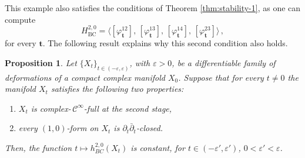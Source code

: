 \documentclass[a4paper]{amsart}
\newtheorem{proposition}[theorem]{Proposition}
\theoremstyle{definition}
\theoremstyle{remark}
\numberwithin{equation}{section}
\begin{document}
This example also satisfies the conditions of Theorem \ref{thm:stability-1}, as one can compute
\[
H_{\text{BC}}^{2,0}=\langle 
[\varphi_{\mathbf{t}}^{12}],\,
[\varphi_{\mathbf{t}}^{13}],\,
[\varphi_{\mathbf{t}}^{14}],\,
[\varphi_{\mathbf{t}}^{23}] \rangle\,,
\]
for every $\mathbf t$. The following result explains why this second condition also holds.

\begin{proposition}\label{prop:BC-const}
Let $\{X_t\}_{t\in(-\varepsilon,\varepsilon)}$, with $\varepsilon>0$, be a differentiable family of deformations of a compact complex manifold $X_0$. Suppose that for every $t\neq 0$ the manifold $X_t$ satisfies the following two properties:
\begin{enumerate}
\item[i)] $X_t$ is complex-\,$\mathcal C^\infty$-full at the second stage,
\item[ii)] every $(1,0)$-form on $X_t$ is $\partial_t\bar{\partial}_t$-closed.%
\end{enumerate}
Then, the function $t\mapsto h_{BC}^{2,0}(X_t)$ is constant, for $t\in(-\varepsilon',\varepsilon')$, $0<\varepsilon'<\varepsilon$.
\end{proposition}
\end{document}
